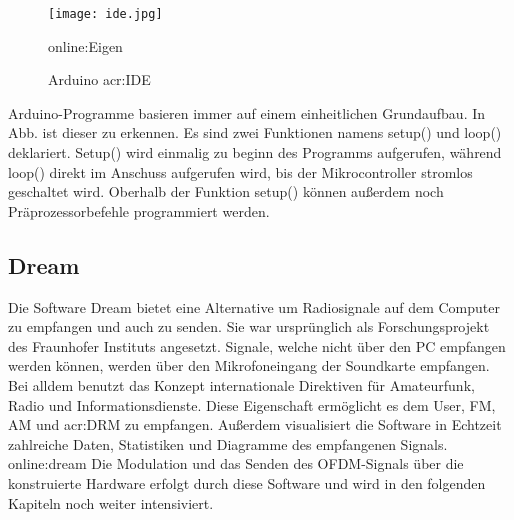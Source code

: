 \begin{figure}[H]
	\centering
	\texttt{[image: ide.jpg]}
	\caption[Arduino \gls{acr:IDE}]{Arduino \gls{acr:IDE}}\gls{online:Eigen}
	\label{fig:ide}
\end{figure}


Arduino-Programme basieren immer auf einem einheitlichen Grundaufbau. In Abb. ist
dieser zu erkennen. Es sind zwei Funktionen namens setup() und loop() deklariert.
Setup() wird einmalig zu beginn des Programms aufgerufen, während loop() direkt im Anschuss aufgerufen wird, bis der Mikrocontroller stromlos geschaltet wird. Oberhalb der Funktion setup() können außerdem noch Präprozessorbefehle programmiert werden.

\subsection{Dream}
\label{subsec:Unterabschnitt12}
Die Software Dream bietet eine Alternative um Radiosignale auf dem Computer zu empfangen und auch zu senden. Sie war ursprünglich als Forschungsprojekt des Fraunhofer Instituts angesetzt. Signale, welche nicht über den PC empfangen werden können, werden über den Mikrofoneingang der Soundkarte empfangen.
Bei alldem benutzt das Konzept internationale Direktiven für Amateurfunk, Radio und Informationsdienste.
Diese Eigenschaft ermöglicht es dem User, FM, AM und \gls{acr:DRM} zu empfangen. Außerdem visualisiert die Software in Echtzeit zahlreiche Daten, Statistiken und Diagramme des empfangenen Signals. \gls{online:dream} Die Modulation und das Senden des OFDM-Signals über die konstruierte Hardware erfolgt durch diese Software und wird in den folgenden Kapiteln noch weiter intensiviert.